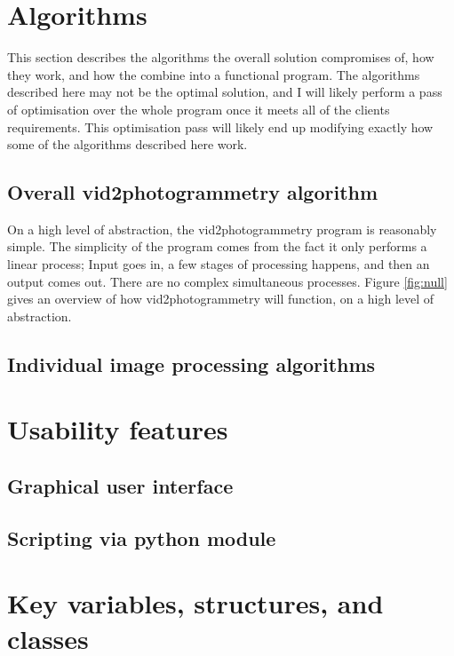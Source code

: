 \documentclass[11pt]{report}
\begin{document}
\section{Algorithms}
This section describes the algorithms the overall solution compromises of, how they work, and how the combine into a functional program. The algorithms described here may not be the optimal solution, and I will likely perform a pass of optimisation over the whole program once it meets all of the clients requirements. This optimisation pass will likely end up modifying exactly how some of the algorithms described here work.
\subsection{Overall vid2photogrammetry algorithm}
On a high level of abstraction, the vid2photogrammetry program is reasonably simple. The simplicity of the program comes from the fact it only performs a linear process; Input goes in, a few stages of processing happens, and then an output comes out. There are no complex simultaneous processes.
Figure \ref{fig:null} gives an overview of how vid2photogrammetry will function, on a high level of abstraction.


\subsection{Individual image processing algorithms}


\section{Usability features}
\subsection{Graphical user interface}
\subsection{Scripting via python module}

\section{Key variables, structures, and classes}
\end{document}
